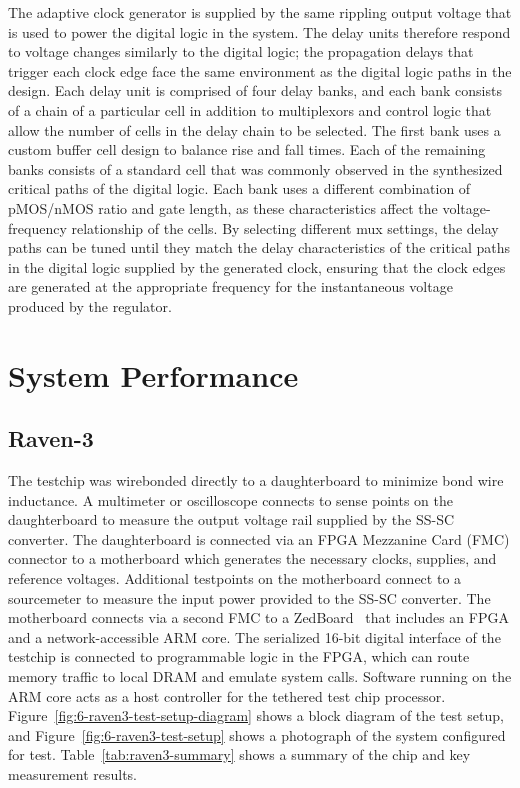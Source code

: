 \documentclass[graybox]{svmult}
\begin{document}
The adaptive clock generator is supplied by the same rippling output voltage that is used to power the digital logic in the system.
The delay units therefore respond to voltage changes similarly to the digital logic; the propagation delays that trigger each clock edge face the same environment as the digital logic paths in the design.
Each delay unit is comprised of four delay banks, and each bank consists of a chain of a particular cell in addition to multiplexors and control logic that allow the number of cells in the delay chain to be selected.
The first bank uses a custom buffer cell design to balance rise and fall times.
Each of the remaining banks consists of a standard cell that was commonly observed in the synthesized critical paths of the digital logic.
Each bank uses a different combination of pMOS/nMOS ratio and gate length, as these characteristics affect the voltage-frequency relationship of the cells.
By selecting different mux settings, the delay paths can be tuned until they match the delay characteristics of the critical paths in the digital logic supplied by the generated clock, ensuring that the clock edges are generated at the appropriate frequency for the instantaneous voltage produced by the regulator.

\section{System Performance}

\subsection{Raven-3}

The testchip was wirebonded directly to a daughterboard to minimize bond wire inductance.
A multimeter or oscilloscope connects to sense points on the daughterboard to measure the output voltage rail supplied by the SS-SC converter.
The daughterboard is connected via an FPGA Mezzanine Card (FMC) connector to a motherboard which generates the necessary clocks, supplies, and reference voltages.
Additional testpoints on the motherboard connect to a sourcemeter to measure the input power provided to the SS-SC converter.
The motherboard connects via a second FMC to a ZedBoard~\cite{ZedBoard} that includes an FPGA and a network-accessible ARM core.
The serialized 16-bit digital interface of the testchip is connected to programmable logic in the FPGA, which can route memory traffic to local DRAM and emulate system calls.
Software running on the ARM core acts as a host controller for the tethered test chip processor.
Figure~\ref{fig:6-raven3-test-setup-diagram} shows a block diagram of the test setup, and Figure~\ref{fig:6-raven3-test-setup} shows a photograph of the system configured for test.
Table~\ref{tab:raven3-summary} shows a summary of the chip and key measurement results.
\end{document}
